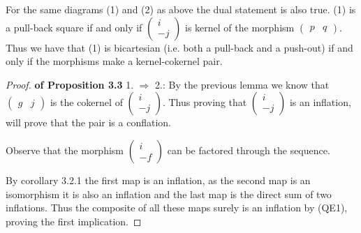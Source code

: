     \begin{corollary}
        For the same diagrams (1) and (2) as above the dual statement is also true. (1) is a pull-back square if and only if $\begin{pmatrix}
            i \\ -j
        \end{pmatrix}$ is kernel of the morphism $\begin{pmatrix}
            p & q
        \end{pmatrix}$. Thus we have that (1) is bicartesian (i.e. both a pull-back and a push-out) if and only if the morphisms make a kernel-cokernel pair.
    \end{corollary}

    \begin{proof}
        \textbf{of Proposition 3.3} 1. $\Rightarrow$ 2.: By the previous lemma we know that $\begin{pmatrix}
            g & j
        \end{pmatrix}$ is the cokernel of $\begin{pmatrix}
            i \\ -j
        \end{pmatrix}$. Thus proving that $\begin{pmatrix}
            i \\ -j
        \end{pmatrix}$ is an inflation, will prove that the pair is a conflation. 
        
        Observe that the morphism $\begin{pmatrix}
            i \\ -f
        \end{pmatrix}$ can be factored through the sequence. 
        \begin{center}
        \end{center}
        By corollary 3.2.1 the first map is an inflation, as the second map is an isomorphism it is also an inflation and the last map is the direct sum of two inflations. Thus the composite of all these maps surely is an inflation by (QE1), proving the first implication.


\end{proof}
